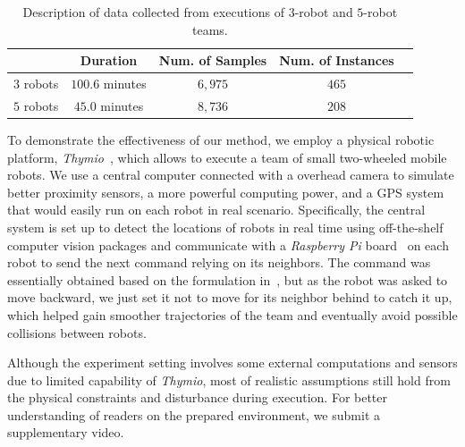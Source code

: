 \documentclass[letterpaper, 10 pt, conference]{ieeeconf}  %
\begin{document}
	\setlength{\tabcolsep}{0.5em} %
	{\renewcommand{\arraystretch}{1.2}%
		\begin{table}[t]
			\centering
			\begin{tabular}{|c|c|c|c|c|}
				\hline
							&  Duration & Num. of Samples & Num. of Instances  \\ \hline
				$3$ robots & $100.6$ minutes & $6,975$ & $465$  \\ \hline
				$5$ robots & $45.0$ minutes  & $8,736$ & $208$  \\ \hline
			\end{tabular}
			\caption{Description of data collected from executions of $3$-robot and $5$-robot teams.}
			\label{table:data_description}
		\end{table}
	}

    To demonstrate the effectiveness of our method, we employ a physical
    robotic platform, \emph{Thymio}~\cite{Shin14}, which allows to
    execute a team of small two-wheeled mobile robots. We use a central
    computer connected with a overhead camera to simulate better
    proximity sensors, a more powerful computing power, and a GPS system
    that would easily run on each robot in real scenario. Specifically,
    the central system is set up to detect the locations of robots in
    real time using off-the-shelf computer vision packages and
    communicate with a \emph{Raspberry Pi} board~\cite{Upton14} on each
    robot to send the next command relying on its neighbors. The command
    was essentially obtained based on the formulation in~\cite{CPR17},
    but as the robot was asked to move backward, we just set it not to
    move for its neighbor behind to catch it up, which helped gain
    smoother trajectories of the team and eventually avoid possible
    collisions between robots.

    Although the experiment setting involves some external computations
    and sensors due to limited capability of \emph{Thymio}, most of
    realistic assumptions still hold from the physical constraints and
    disturbance during execution. For better understanding of readers on
    the prepared environment, we submit a supplementary video.
\end{document}
